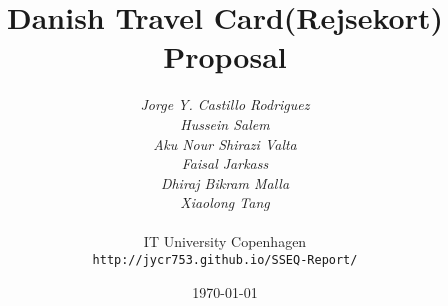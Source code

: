 \documentclass[10pt,a4paper,oneside]{scrreprt}
\begin{document}
\title{Danish Travel Card(Rejsekort) Proposal}
\author{\textit{Jorge Y. Castillo Rodriguez}\\
  \textit{Hussein Salem}\\
  \textit{Aku Nour Shirazi Valta}\\
  \textit{Faisal Jarkass}\\
  \textit{Dhiraj Bikram Malla}\\
  \textit{Xiaolong Tang}\\
  \\
  IT University Copenhagen\\
  \texttt{http://jycr753.github.io/SSEQ-Report/}}
\date{\today}
\maketitle


\end{document}
